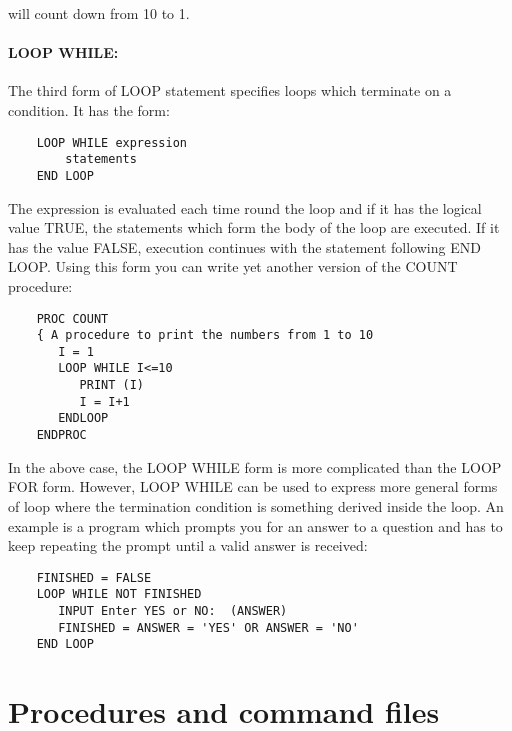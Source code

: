 will count down from 10 to 1. 

\paragraph{LOOP WHILE:}\hfill

The third form of LOOP statement specifies loops which terminate on a condition.
It has the form:

\begin{small}
\begin{verbatim}
    LOOP WHILE expression
        statements                                              
    END LOOP
\end{verbatim}
\end{small}

The expression is evaluated each time round the loop and if it has the logical
value TRUE, the statements which form the body of the loop are executed.
If it has the value FALSE, execution continues with the statement following
END LOOP.
Using this form you can write yet another version of the COUNT procedure:

\begin{small}
\begin{verbatim}
    PROC COUNT
    { A procedure to print the numbers from 1 to 10
       I = 1
       LOOP WHILE I<=10
          PRINT (I)
          I = I+1
       ENDLOOP
    ENDPROC
\end{verbatim}
\end{small}

In the above case, the LOOP WHILE form is more complicated than the LOOP FOR
form.
However, LOOP WHILE can be used to express more general forms of loop
where the termination condition is something derived inside the loop.
An example is a program which prompts you for an answer to a question
and has to keep repeating the prompt until a valid answer is received:

\begin{small}
\begin{verbatim}
    FINISHED = FALSE
    LOOP WHILE NOT FINISHED
       INPUT Enter YES or NO:  (ANSWER)
       FINISHED = ANSWER = 'YES' OR ANSWER = 'NO'
    END LOOP
\end{verbatim}
\end{small}

\section{Procedures and command files}
\label{S_pcf}

